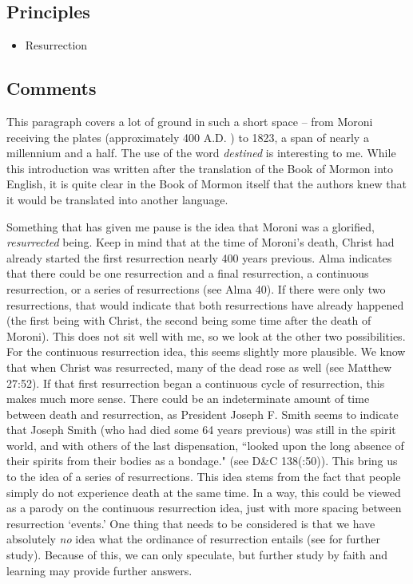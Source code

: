 \documentclass[12pt]{report}
\begin{document}
\subsection{Principles\label{intro:principles4}}
\begin{itemize}
\item {}Resurrection
\end{itemize}

\subsection{Comments\label{intro:comments4}}
This paragraph covers a lot of ground in such a short space -- from Moroni receiving the plates (approximately 400 \scriptsize A.D. \normalsize) to 1823, a span of nearly a millennium and a half.  The use of the word \emph{destined} is interesting to me.  While this introduction was written after the translation of the Book of Mormon into English, it is quite clear in the Book of Mormon itself that the authors knew that it would be translated into another language.

Something that has given me pause is the idea that Moroni was a glorified, \emph{resurrected} being.  Keep in mind that at the time of Moroni's death, Christ had already started the first resurrection nearly 400 years previous.  Alma indicates that there could be one resurrection and a final resurrection, a continuous resurrection, or a series of resurrections (see Alma 40).  If there were only two resurrections, that would indicate that both resurrections have already happened (the first being with Christ, the second being some time after the death of Moroni).  This does not sit well with me, so we look at the other two possibilities.  For the continuous resurrection idea, this seems slightly more plausible.  We know that when Christ was resurrected, many of the dead rose as well (see Matthew 27:52).  If that first resurrection began a continuous cycle of resurrection, this makes much more sense.  There could be an indeterminate amount of time between death and resurrection, as President Joseph F. Smith seems to indicate that Joseph Smith (who had died some 64 years previous) was still in the spirit world, and with others of the last dispensation, ``looked upon the long absence of their spirits from their bodies as a bondage." (see D\&C 138(:50)).  This bring us to the idea of a series of resurrections.  This idea stems from the fact that people simply do not experience death at the same time.  In a way, this could be viewed as a parody on the continuous resurrection idea, just with more spacing between resurrection `events.'  One thing that needs to be considered is that we have absolutely \emph{no} idea what the ordinance of resurrection entails (see  for further study).  Because of this, we can only speculate, but further study by faith and learning may provide further answers.
\end{document}
